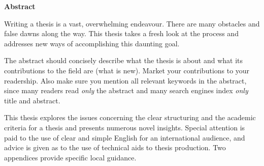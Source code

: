 

\cleardoublepage

\vspace*{2cm}

\begin{center}
{\Large\sffamily\bfseries Abstract}
\end{center}

Writing a thesis is a vast, overwhelming endeavour. There are many
obstacles and false dawns along the way. This thesis takes a fresh
look at the process and addresses new ways of accomplishing this
daunting goal.

The abstract should concisely describe what the thesis is about and
what its contributions to the field are (what is new). Market your
contributions to your readership. Also make sure you mention all
relevant keywords in the abstract, since many readers read \emph{only}
the abstract and many search engines index \emph{only} title and
abstract.

This thesis explores the issues concerning the clear structuring and
the academic criteria for a thesis and presents numerous novel
insights. Special attention is paid to the use of clear and simple
English for an international audience, and advice is given as to the
use of technical aids to thesis production. Two appendices provide
specific local guidance.

